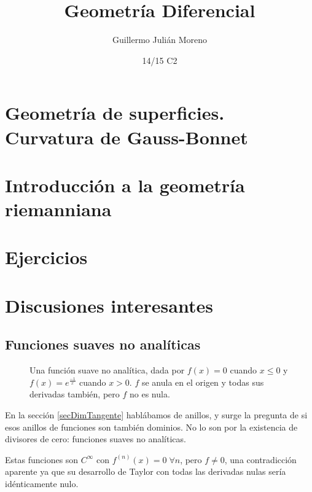 \documentclass{apuntes}
\title{Geometría Diferencial}
\author{Guillermo Julián Moreno}
\date{14/15 C2}
\begin{document}
\pagestyle{plain}
\maketitle

\tableofcontents
\newpage






\chapter{Geometría de superficies. Curvatura de Gauss-Bonnet}

\chapter{Introducción a la geometría riemanniana}

\appendix

\chapter{Ejercicios}


\chapter{Discusiones interesantes}

\section{Funciones suaves no analíticas}

\begin{figure}[hbtp]
\centering
{}
\caption{Una función suave no analítica, dada por $f(x) = 0$ cuando $x ≤ 0$ y $f(x) = e^{\frac{-1}{x}}$ cuando $x > 0$. $f$ se anula en el origen y todas sus derivadas también, pero $f$ no es nula.}
\end{figure}

En la sección \ref{secDimTangente} hablábamos de anillos, y surge la pregunta de si esos anillos de funciones son también dominios. No lo son por la existencia de divisores de cero: funciones suaves no analíticas.

Estas funciones son $C^∞$ con $f^{(n)}(x) = 0\; ∀n$, pero $f ≠ 0$, una contradicción aparente ya que su desarrollo de Taylor con todas las derivadas nulas sería idénticamente nulo.
\end{document}
